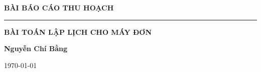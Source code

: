 \documentclass[12pt,a4paper]{report}
\begin{document}
 
    \begin{titlepage}
	\centering
    \phantom{}\par
	\vspace{3cm}
	{\LARGE\textbf{BÀI BÁO CÁO THU HOẠCH}\par}
	\vspace{1cm}
	\rule{5cm}{0.5pt}\par
	\vspace{1cm}
		{\LARGE\textbf{BÀI TOÁN LẬP LỊCH CHO MÁY ĐƠN}\par}
	\vspace{1cm}
	\Large\textbf{Nguyễn Chí Bằng}\par		
	\vspace{1cm}
    \today
    \end{titlepage}

	\tableofcontents
\end{document}
